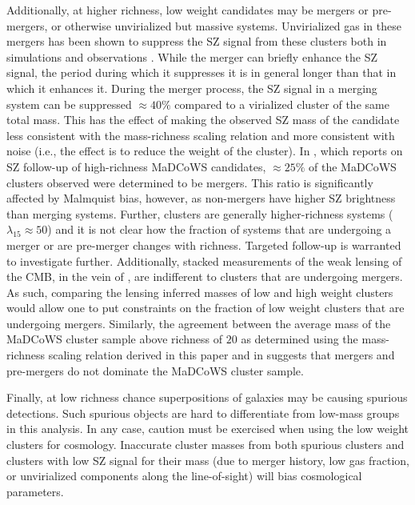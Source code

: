 \documentclass[longauth]{aa} %
\newcommand{\madcows}{MaDCoWS\xspace}
\begin{document}
Additionally, at higher richness, low weight candidates may be mergers or pre-mergers, or otherwise unvirialized but massive systems. Unvirialized gas in these mergers has been shown to suppress the SZ signal from these clusters both in simulations \citep[e.g.,][]{Wik2008,Battaglia2012,Nelson2014} and observations \citep[e.g.,][]{Hilton2018}. While the merger can briefly enhance the SZ signal, the period during which it suppresses it is in general longer than that in which it enhances it. During the merger process, the SZ signal in a merging system can be suppressed $\approx 40\%$ \citep{Dicker2020} compared to a virialized cluster of the same total mass. This has the effect of making the observed SZ mass of the candidate less consistent with the mass-richness scaling relation and more consistent with noise (i.e., the effect is to reduce the weight of the cluster). In \citet{Dicker2020}, which reports on SZ follow-up of high-richness MaDCoWS candidates, $\approx 25\%$ of the MaDCoWS clusters observed were determined to be mergers. This ratio is significantly affected by Malmquist bias, however, as non-mergers have higher SZ brightness than merging systems. Further, \citet{Dicker2020} clusters are generally higher-richness systems ($\lambda_{15} \approx 50$) and it is not clear how the fraction of systems that are undergoing a merger or are pre-merger changes with richness. %
Targeted follow-up is warranted to investigate further. Additionally, stacked measurements of the weak lensing of the CMB, in the vein of \citet{Madhavacheril2020}, are indifferent to clusters that are undergoing mergers. %
As such, comparing the lensing inferred masses of low and high weight clusters would allow one to put constraints on the fraction of low weight clusters that are undergoing mergers. Similarly, the agreement between the average mass of the \madcows cluster sample above richness of $20$ as determined using the mass-richness scaling relation derived in this paper and in \citet{Madhavacheril2020} suggests that mergers and pre-mergers do not dominate the \madcows cluster sample.

Finally, at low richness chance superpositions of galaxies may be causing spurious detections. Such spurious objects are hard to differentiate from low-mass groups in this analysis. In any case, caution must be exercised when using the low weight clusters for cosmology. Inaccurate cluster masses from both spurious clusters and clusters with low SZ signal for their mass (due to merger history, low gas fraction, or unvirialized components along the line-of-sight) will bias cosmological parameters.
\end{document}
